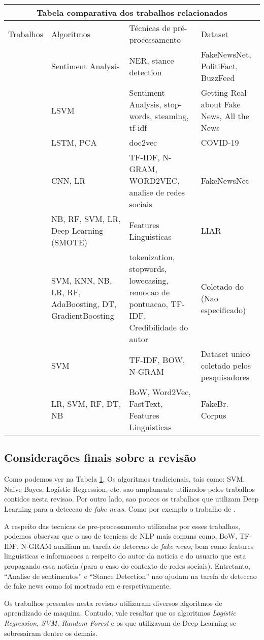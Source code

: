 \begin{table}
 \label{table:tablecomparativa1}
\begin{tabular}{ |p{3cm}||p{3cm}|p{3cm}|p{3cm}|  }
 \hline
 \multicolumn{4}{|c|}{Tabela comparativa dos trabalhos relacionados} \\
 \hline
 Trabalhos& Algoritmos & Técnicas de pré-processamento&Dataset\\
 \hline
 \citet{parikh2019}   &  Sentiment Analysis   & NER, stance detection & FakeNewsNet, PolitiFact, BuzzFeed  \\
 \citet{baarir2020}&   LSVM  & Sentiment Analysis, stop-words, steaming, tf-idf   & Getting Real about Fake News, All the News \\
 \citet{DeMagistris2022} & LSTM, PCA & doc2vec & COVID-19  \\
 \citet{Wu2021530}  & CNN, LR & TF-IDF, N-GRAM, WORD2VEC, analise de redes sociais  & FakeNewsNet \\
 \citet{Mouratidis20211}& NB, RF, SVM, LR, Deep Learning (SMOTE)    & Features Linguisticas & LIAR \\
 \citet{SelvaBirunda2021406}&  SVM, KNN, NB, LR, RF, AdaBoosting, DT, GradientBoosting & tokenization, stopwords, lowecasing, remocao de pontuacao, TF-IDF, Credibilidade do autor & Coletado do \cite{kaggle} (Nao especificado)\\
 \citet{Setiawan2021}& SVM  & TF-IDF, BOW, N-GRAM & Dataset unico coletado pelos pesquisadores \\
 \citet{Silva2020}&  LR, SVM, RF, DT, NB  & BoW, Word2Vec, FastText, Features Linguisticas & FakeBr. Corpus\\
 \hline
\end{tabular}
\end{table}

\subsection{Considerações finais sobre a revisão}

Como podemos ver na Tabela \ref{table:tablecomparativa1}, Os algoritmos tradicionais, tais como: SVM, Naive Bayes, Logistic Regression, etc. sao amplamente utilizados pelos trabalhos contidos nesta revisao. Por outro lado, sao poucos os trabalhos que utilizam Deep Learning para a deteccao de \textit{fake news}. Como por exemplo o trabalho de \citet{Mouratidis20211}.

A respeito das tecnicas de pre-processamento utilizadas por esses trabalhos, podemos observar que o uso de tecnicas de NLP mais comuns como, BoW, TF-IDF, N-GRAM auxiliam na tarefa de deteccao de \textit{fake news}, bem como features linguisticas e informacoes a respeito do autor da noticia e do usuario que esta propagando essa noticia (para o caso do contexto de redes sociais).  Entretanto, ``Analise de sentimentos'' e ``Stance Detection''  nao ajudam na tarefa de deteccao de fake news como foi mostrado em \citet{baarir2020} e \citet{DeMagistris2022} respctivamente. 

Os trabalhos presentes nesta revisao utilizaram diversos algoritmos de aprendizado de maquina. Contudo, vale resaltar que os algoritmos \textit{Logistic Regression, SVM, Random Forest} e os que utilizavam de Deep Learning se sobresairam dentre os demais.


